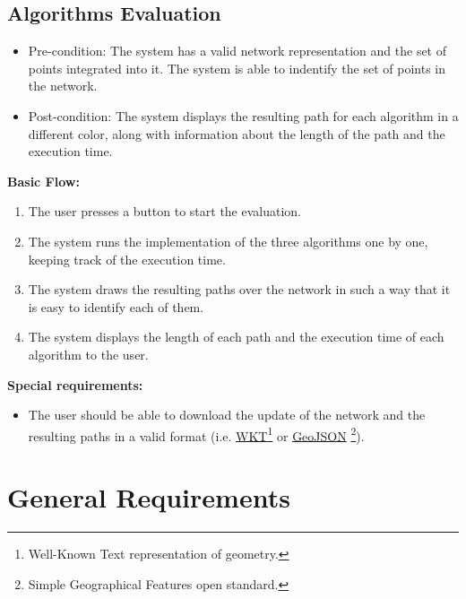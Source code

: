 \documentclass[11pt]{article}
\begin{document}
\subsection{Algorithms Evaluation}

\begin{itemize}
    \item Pre-condition: The system has a valid network representation and the set of points integrated into it. The system is able to indentify the set of points in the network.
    \item Post-condition: The system displays the resulting path for each algorithm in a different color, along with information about the length of the path and the execution time.
\end{itemize}

\textbf{Basic Flow:}
\begin{enumerate}
    \item The user presses a button to start the evaluation.
    \item The system runs the implementation of the three algorithms one by one, keeping track of the execution time.
    \item The system draws the resulting paths over the network in such a way that it is easy to identify each of them.
    \item The system displays the length of each path and the execution time of each algorithm to the user.
\end{enumerate}

\textbf{Special requirements:}
\begin{itemize}
    \item The user should be able to download the update of the network and the resulting paths in a valid format (i.e. \href{https://en.wikipedia.org/wiki/Well-known_text_representation_of_geometry}{WKT}\footnote{Well-Known Text representation of geometry.} or \href{https://en.wikipedia.org/wiki/GeoJSON}{GeoJSON} \footnote{Simple Geographical Features open standard.}).
\end{itemize}

\section{General Requirements}
\end{document}
